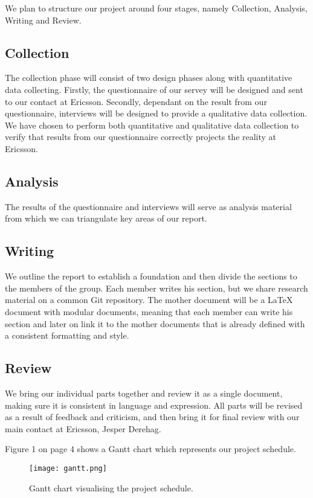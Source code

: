 \documentclass[ProjectPlan_innit.tex]{subfiles}
\begin{document}
We plan to structure our project around four stages, namely Collection, Analysis, Writing and Review. 

\subsection{Collection}
The collection phase will consist of two design phases along with quantitative data collecting. Firstly, the questionnaire of our servey will be designed and sent to our contact at Ericsson. Secondly, dependant on the result from our questionnaire, interviews will be designed to provide a qualitative data collection. We have chosen to perform both quantitative and qualitative data collection to verify that results from our questionnaire correctly projects the reality at Ericsson.

\subsection{Analysis}
The results of the questionnaire and interviews will serve as analysis material from which we can triangulate key areas of our report.

\subsection{Writing}
We outline the report to establish a foundation and then divide the sections to the members of the group. Each member writes his section, but we share research material on a common Git repository. The mother document will be a LaTeX document with modular documents, meaning that each member can write his section and later on link it to the mother documents that is already defined with a consistent formatting and style.

\subsection{Review}
We bring our individual parts together and review it as a single document, making sure it is consistent in language and expression. All parts will be revised as a result of feedback and criticism, and then bring it for final review with our main contact at Ericsson, Jesper Derehag.  

\smallskip

Figure 1 on page 4 shows a Gantt chart which represents our project schedule. 

\begin{figure*}[H!]
	\texttt{[image: gantt.png]}
	\caption{Gantt chart visualising the project schedule.}
	\label{AAA}
\end{figure*}
\end{document}
